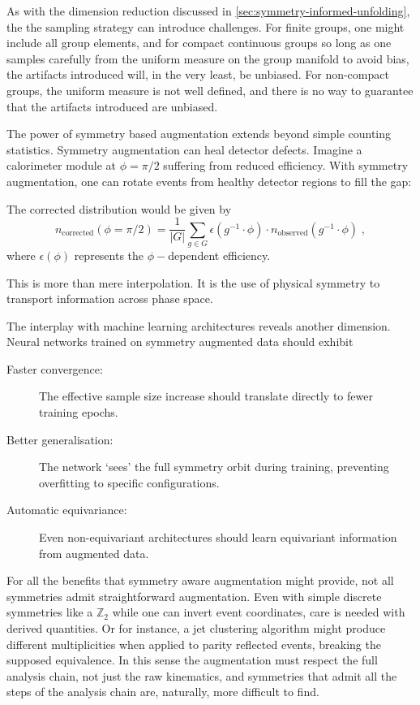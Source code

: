         As with the dimension reduction discussed in \cref{sec:symmetry-informed-unfolding}, the the sampling strategy can introduce challenges.
        For finite groups, one might include all group elements, and for compact continuous groups so long as one samples carefully from the uniform measure on the group manifold to avoid bias, the artifacts introduced will, in the very least, be unbiased.
        For non-compact groups, the uniform measure is not well defined, and there is no way to guarantee that the artifacts introduced are unbiased.

        The power of symmetry based augmentation extends beyond simple counting statistics.
        Symmetry augmentation can heal detector defects.
        Imagine a calorimeter module at \(\phi = \pi/2\) suffering from reduced efficiency.
        With symmetry augmentation, one can rotate events from healthy detector regions to fill the gap:

        The corrected distribution would be given by
        \[
            n_{\text{corrected}}(\phi = \pi/2) = \frac{1}{|G|} \sum_{g \in G} \epsilon(g^{-1} \cdot \phi) \cdot n_{\text{observed}}(g^{-1} \cdot \phi)\;,
        \]
        where \(\epsilon(\phi)\) represents the \(\phi-\)dependent efficiency.
        
        This is more than mere interpolation.
        It is the use of physical symmetry to transport information across phase space.

        The interplay with machine learning architectures reveals another dimension.
        Neural networks trained on symmetry augmented data should exhibit
        \begin{description}
            \item[Faster convergence:] The effective sample size increase should translate directly to fewer training epochs.
            \item[Better generalisation:] The network `sees' the full symmetry orbit during training, preventing overfitting to specific configurations.
            \item[Automatic equivariance:] Even non-equivariant architectures should learn equivariant information from augmented data.
        \end{description}
        
        For all the benefits that symmetry aware augmentation might provide, not all symmetries admit straightforward augmentation.
        Even with simple discrete symmetries like a \(\mathbb{Z}_2\) while one can invert event coordinates, care is needed with derived quantities.
        Or for instance, a jet clustering algorithm might produce different multiplicities when applied to parity reflected events, breaking the supposed equivalence.
        In this sense the augmentation must respect the full analysis chain, not just the raw kinematics, and symmetries that admit all the steps of the analysis chain are, naturally, more difficult to find.

